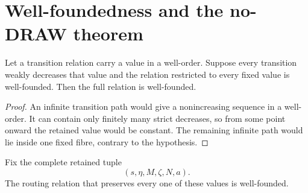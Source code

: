 \section{Well-foundedness and the no-DRAW theorem}\label{sec:global}

\begin{lemma}\label{lem:fibre-principle}
Let a transition relation carry a value in a well-order.  Suppose every
transition weakly decreases that value and the relation restricted to every
fixed value is well-founded.  Then the full relation is well-founded.
\end{lemma}

\begin{proof}
An infinite transition path would give a nonincreasing sequence in a
well-order.  It can contain only finitely many strict decreases, so from some
point onward the retained value would be constant.  The remaining infinite
path would lie inside one fixed fibre, contrary to the hypothesis.
\end{proof}

\begin{proposition}
\label{prop:fixed-fibre}
Fix the complete retained tuple
\[
 (s,\eta,M,\zeta,N,a).
\]
The routing relation that preserves every one of these values is
well-founded.
\end{proposition}

